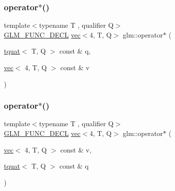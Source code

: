 \subsubsection{\texorpdfstring{operator$\ast$()}{operator*()}\hspace{0.1cm}{\footnotesize\ttfamily [4/7]}}
{\footnotesize\ttfamily template$<$typename T , qualifier Q$>$ \\
\mbox{\hyperlink{setup_8hpp_ab2d052de21a70539923e9bcbf6e83a51}{G\+L\+M\+\_\+\+F\+U\+N\+C\+\_\+\+D\+E\+CL}} \mbox{\hyperlink{structglm_1_1vec}{vec}}$<$4, T, Q$>$ glm\+::operator$\ast$ (\begin{DoxyParamCaption}\item[{\mbox{\hyperlink{structglm_1_1tquat}{tquat}}$<$ T, Q $>$ const \&}]{q,  }\item[{\mbox{\hyperlink{structglm_1_1vec}{vec}}$<$ 4, T, Q $>$ const \&}]{v }\end{DoxyParamCaption})}

\mbox{\label{group__gtc__quaternion_ga16c91c9dc2f0346faa3742888339b11d}} 
\subsubsection{\texorpdfstring{operator$\ast$()}{operator*()}\hspace{0.1cm}{\footnotesize\ttfamily [5/7]}}
{\footnotesize\ttfamily template$<$typename T , qualifier Q$>$ \\
\mbox{\hyperlink{setup_8hpp_ab2d052de21a70539923e9bcbf6e83a51}{G\+L\+M\+\_\+\+F\+U\+N\+C\+\_\+\+D\+E\+CL}} \mbox{\hyperlink{structglm_1_1vec}{vec}}$<$4, T, Q$>$ glm\+::operator$\ast$ (\begin{DoxyParamCaption}\item[{\mbox{\hyperlink{structglm_1_1vec}{vec}}$<$ 4, T, Q $>$ const \&}]{v,  }\item[{\mbox{\hyperlink{structglm_1_1tquat}{tquat}}$<$ T, Q $>$ const \&}]{q }\end{DoxyParamCaption})}

\mbox{\label{group__gtc__quaternion_ga603ee29c61884b9438d5eae0c548b891}} 
